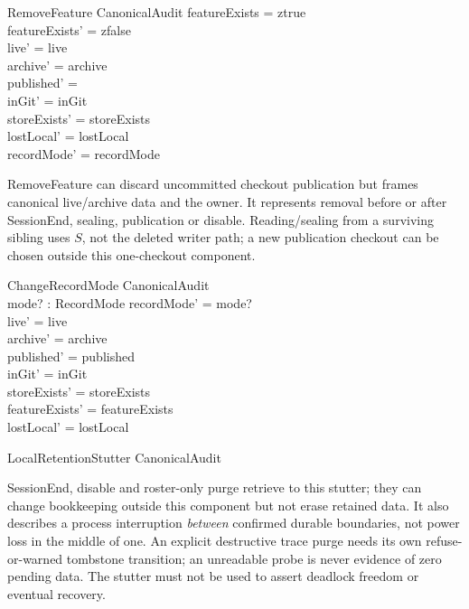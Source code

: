 \documentclass[a4paper,10pt,fleqn]{article}
\begin{document}
\begin{schema}{RemoveFeature}
\Delta CanonicalAudit
\where
featureExists = ztrue \\
featureExists' = zfalse \\
live' = live \\
archive' = archive \\
published' = \emptyset \\
inGit' = inGit \\
storeExists' = storeExists \\
lostLocal' = lostLocal \\
recordMode' = recordMode
\end{schema}

RemoveFeature can discard uncommitted checkout publication but frames
canonical live/archive data and the owner. It represents removal before
or after SessionEnd, sealing, publication or disable. Reading/sealing
from a surviving sibling uses $S$, not the deleted writer path; a new
publication checkout can be chosen outside this one-checkout component.

\begin{schema}{ChangeRecordMode}
\Delta CanonicalAudit \\
mode? : RecordMode
\where
recordMode' = mode? \\
live' = live \\
archive' = archive \\
published' = published \\
inGit' = inGit \\
storeExists' = storeExists \\
featureExists' = featureExists \\
lostLocal' = lostLocal
\end{schema}

\begin{schema}{LocalRetentionStutter}
\Xi CanonicalAudit
\end{schema}

SessionEnd, disable and roster-only purge retrieve to this stutter;
they can change bookkeeping outside this component but not erase
retained data. It also describes a process interruption \emph{between}
confirmed durable boundaries, not power loss in the middle of one.
An explicit destructive trace purge needs its own refuse-or-warned
tombstone transition; an unreadable probe is never evidence of zero
pending data. The stutter must not be used to assert deadlock freedom
or eventual recovery.
\end{document}

